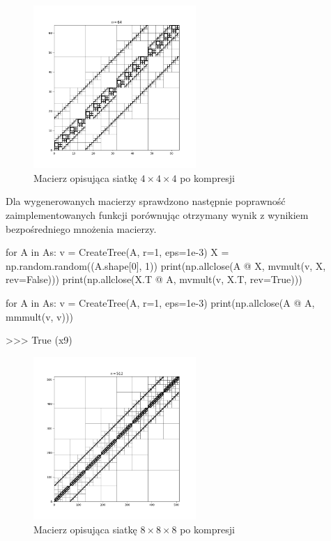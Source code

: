 \documentclass{../myclass}
\begin{document}
\begin{figure}[ht]
    \centering
    \includegraphics[width=0.55\textwidth]{0_bp_hm.png}
    \caption{Macierz opisująca siatkę \(4\times4\times4\) po kompresji}
    \label{fig:1}
\end{figure}

Dla wygenerowanych macierzy sprawdzono następnie poprawność zaimplementowanych funkcji porównując otrzymany wynik z wynikiem bezpośredniego mnożenia macierzy.
\begin{python}
for A in As:
    v = CreateTree(A, r=1, eps=1e-3)
    X = np.random.random((A.shape[0], 1))
    print(np.allclose(A @ X, mvmult(v, X, rev=False)))
    print(np.allclose(X.T @ A, mvmult(v, X.T, rev=True)))

for A in As:
    v = CreateTree(A, r=1, eps=1e-3)
    print(np.allclose(A @ A, mmmult(v, v)))

>>> True (x9)
\end{python}

\begin{figure}[h!]
    \centering
    \includegraphics[width=0.55\textwidth]{1_bp_hm.png}
    \caption{Macierz opisująca siatkę \(8\times8\times8\) po kompresji}
    \label{fig:2}
\end{figure}
\end{document}

